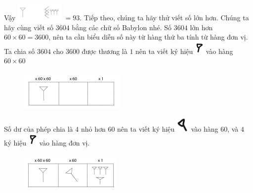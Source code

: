 \begin{multicols}{2}
\begin{figure}[H]
	\end{figure}
	Vậy \includegraphics[scale=0.85]{23}  $= 93$.
	\vskip 0.1cm
	Tiếp theo, chúng ta hãy thử viết số lớn hơn. Chúng ta hãy cùng viết số $3604$ bằng các chữ số Babylon nhé. Số $3604$ lớn hơn $60\times 60=3600$, nên ta cần biểu diễn số này từ hàng thứ ba tính từ hàng đơn vị. Ta chia số $3604$ cho $3600$ được thương là $1$ nên ta viết ký hiệu \includegraphics[scale=0.7]{15}  vào hàng $60\times60$
	\begin{figure}[H]
		\centering
		\vspace*{-5pt}
		\captionsetup{labelformat= empty, justification=centering}
		\includegraphics[width=0.65\linewidth]{25}
		\vspace*{-10pt}
	\end{figure}
	Số dư của phép chia là $4$ nhỏ hơn $60$ nên ta viết ký hiệu \includegraphics[scale=0.6]{15.1} vào hàng $60$, và $4$ ký hiệu \includegraphics[scale=0.7]{15} vào hàng đơn vị. 
	\begin{figure}[H]
		\centering
		\vspace*{-5pt}
		\captionsetup{labelformat= empty, justification=centering}
		\includegraphics[width=0.65\linewidth]{26}
		\vspace*{-10pt}

\end{figure}
\end{multicols}

